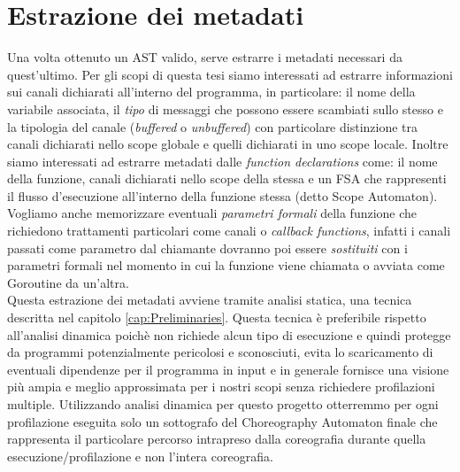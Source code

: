\section{Estrazione dei metadati}
Una volta ottenuto un AST valido, serve estrarre i metadati necessari da quest'ultimo. Per gli scopi di questa tesi siamo interessati ad estrarre informazioni sui canali dichiarati all'interno del programma, in particolare: il nome della variabile associata, il \emph{tipo} di messaggi che possono essere scambiati sullo stesso e la tipologia del canale (\emph{buffered} o \emph{unbuffered}) con particolare distinzione tra canali dichiarati nello scope globale e quelli dichiarati in uno scope locale. Inoltre siamo interessati ad estrarre metadati dalle \emph{function declarations} come: il nome della funzione, canali dichiarati nello scope della stessa e un FSA che rappresenti il flusso d'esecuzione all'interno della funzione stessa (detto Scope Automaton). Vogliamo anche memorizzare eventuali \emph{parametri formali} della funzione che richiedono trattamenti particolari come canali o \emph{callback functions}, infatti i canali passati come parametro dal chiamante dovranno poi essere \emph{sostituiti} con i parametri formali nel momento in cui la funzione viene chiamata o avviata come Goroutine da un'altra. \bigskip \\
Questa estrazione dei metadati avviene tramite analisi statica, una tecnica descritta nel capitolo \ref{cap:Preliminaries}. Questa tecnica è preferibile rispetto all'analisi dinamica poichè non richiede alcun tipo di esecuzione e quindi protegge da programmi potenzialmente pericolosi e sconosciuti, evita lo scaricamento di eventuali dipendenze per il programma in input e in generale fornisce una visione più ampia e meglio approssimata per i nostri scopi senza richiedere profilazioni multiple. Utilizzando analisi dinamica per questo progetto otterremmo per ogni profilazione eseguita solo un sottografo del Choreography Automaton finale che rappresenta il particolare percorso intrapreso dalla coreografia durante quella esecuzione/profilazione e non l'intera coreografia.

